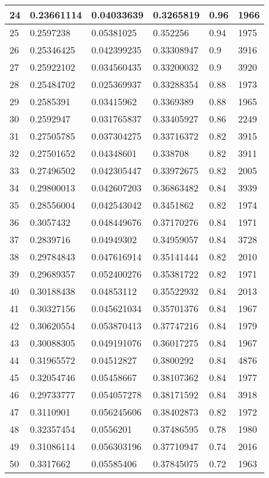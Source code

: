 \begin{longtable}{|l|l|l|l|l|l|}
24 & 0.23661114 & 0.04033639 & 0.3265819 & 0.96 & 1966 \\ \hline 
25 & 0.2597238 & 0.05381025 & 0.352256 & 0.94 & 1975 \\ \hline 
26 & 0.25346425 & 0.042399235 & 0.33308947 & 0.9 & 3916 \\ \hline 
27 & 0.25922102 & 0.034560435 & 0.33200032 & 0.9 & 3920 \\ \hline 
28 & 0.25484702 & 0.025369937 & 0.33288354 & 0.88 & 1973 \\ \hline 
29 & 0.2585391 & 0.03415962 & 0.3369389 & 0.88 & 1965 \\ \hline 
30 & 0.2592947 & 0.031765837 & 0.33405927 & 0.86 & 2249 \\ \hline 
31 & 0.27505785 & 0.037304275 & 0.33716372 & 0.82 & 3915 \\ \hline 
32 & 0.27501652 & 0.04348601 & 0.338708 & 0.82 & 3911 \\ \hline 
33 & 0.27496502 & 0.042305447 & 0.33972675 & 0.82 & 2005 \\ \hline 
34 & 0.29800013 & 0.042607203 & 0.36863482 & 0.84 & 3939 \\ \hline 
35 & 0.28556004 & 0.042543042 & 0.3451862 & 0.82 & 1974 \\ \hline 
36 & 0.3057432 & 0.048449676 & 0.37170276 & 0.84 & 1971 \\ \hline 
37 & 0.2839716 & 0.04949302 & 0.34959057 & 0.84 & 3728 \\ \hline 
38 & 0.29784843 & 0.047616914 & 0.35141444 & 0.82 & 2010 \\ \hline 
39 & 0.29689357 & 0.052400276 & 0.35381722 & 0.82 & 1971 \\ \hline 
40 & 0.30188438 & 0.04853112 & 0.35522932 & 0.84 & 2013 \\ \hline 
41 & 0.30327156 & 0.045621034 & 0.35701376 & 0.84 & 1967 \\ \hline 
42 & 0.30620554 & 0.053870413 & 0.37747216 & 0.84 & 1979 \\ \hline 
43 & 0.30088305 & 0.049191076 & 0.36017275 & 0.84 & 1967 \\ \hline 
44 & 0.31965572 & 0.04512827 & 0.3800292 & 0.84 & 4876 \\ \hline 
45 & 0.32054746 & 0.05458667 & 0.38107362 & 0.84 & 1977 \\ \hline 
46 & 0.29733777 & 0.054057278 & 0.38171592 & 0.84 & 3918 \\ \hline 
47 & 0.3110901 & 0.056245606 & 0.38402873 & 0.82 & 1972 \\ \hline 
48 & 0.32357454 & 0.0556201 & 0.37486595 & 0.78 & 1980 \\ \hline 
49 & 0.31086114 & 0.056303196 & 0.37710947 & 0.74 & 2016 \\ \hline 
50 & 0.3317662 & 0.05585406 & 0.37845075 & 0.72 & 1963 \\ \hline 
\end{longtable}